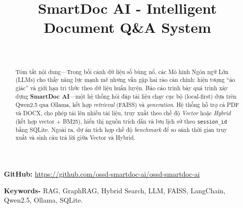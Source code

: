 \documentclass[10pt, conference, a4paper, compsocconf]{IEEEtran}
\begin{document}
\fontsize{10}{12}
\selectfont

\renewcommand{\thesection}{\Roman{section}}
\renewcommand{\thesubsection}{\thesection.\arabic{subsection}}
\renewcommand{\thesubsubsection}{\thesubsection.\arabic{subsubsection}}

\renewcommand{\figurename}{Hình}
\renewcommand{\tablename}{Bảng}


\title{SmartDoc AI - Intelligent Document Q\&A System}

\author{
  \\
}
\maketitle

\noindent\textbf{GitHub:} \url{https://github.com/ossd-smartdoc-ai/ossd-smartdoc-ai}

\begin{abstract}
  Tóm tắt nội dung—Trong bối cảnh dữ liệu số bùng nổ, các Mô hình Ngôn ngữ Lớn (LLMs) cho thấy năng lực mạnh mẽ nhưng vẫn gặp hai rào cản chính: hiện tượng ``ảo giác'' và giới hạn tri thức theo dữ liệu huấn luyện. Báo cáo trình bày quá trình xây dựng \textbf{SmartDoc AI}—một hệ thống hỏi đáp tài liệu chạy cục bộ (local-first) dựa trên Qwen2.5 qua Ollama, kết hợp \textit{retrieval} (FAISS) và \textit{generation}. Hệ thống hỗ trợ cả PDF và DOCX, cho phép tải lên nhiều tài liệu, truy xuất theo chế độ \textit{Vector} hoặc \textit{Hybrid} (kết hợp vector + BM25), hiển thị nguồn trích dẫn và lưu lịch sử theo \texttt{session\_id} bằng SQLite. Ngoài ra, dự án tích hợp chế độ \textit{benchmark} để so sánh thời gian truy xuất và sinh câu trả lời giữa Vector và Hybrid.
\end{abstract}

\noindent\textbf{Keywords-} RAG, GraphRAG, Hybrid Search, LLM, FAISS, LangChain, Qwen2.5, Ollama, SQLite.
\end{document}
